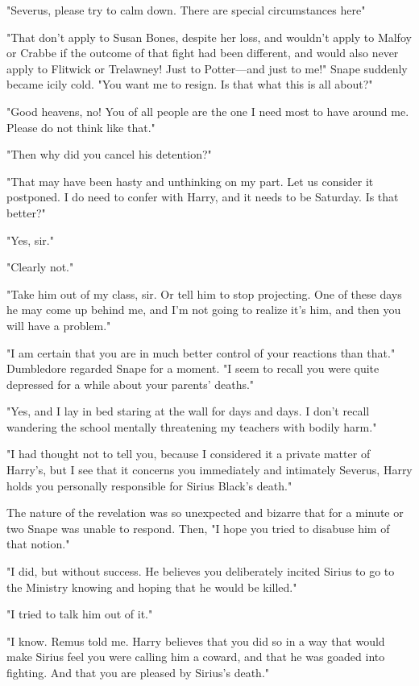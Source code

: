 "Severus, please try to calm down. There are special circumstances here{\el}"

"That don't apply to Susan Bones, despite her loss, and wouldn't apply to Malfoy or Crabbe if the outcome of that fight had been different, and would also never apply to Flitwick or Trelawney! Just to Potter—and just to me!" Snape suddenly became icily cold. "You want me to resign. Is that what this is all about?"

"Good heavens, no! You of all people are the one I need most to have around me. Please do not think like that."

"Then why did you cancel his detention?"

"That may have been hasty and unthinking on my part. Let us consider it postponed. I do need to confer with Harry, and it needs to be Saturday. Is that better?"

"Yes, sir."

"Clearly not."

"Take him out of my class, sir. Or tell him to stop projecting. One of these days he may come up behind me, and I'm not going to realize it's him, and then you will have a problem."

"I am certain that you are in much better control of your reactions than that." Dumbledore regarded Snape for a moment. "I seem to recall you were quite depressed for a while about your parents' deaths."

"Yes, and I lay in bed staring at the wall for days and days. I don't recall wandering the school mentally threatening my teachers with bodily harm."

"I had thought not to tell you, because I considered it a private matter of Harry's, but I see that it concerns you immediately and intimately{\el} Severus, Harry holds you personally responsible for Sirius Black's death."

The nature of the revelation was so unexpected and bizarre that for a minute or two Snape was unable to respond. Then, "I hope you tried to disabuse him of that notion."

"I did, but without success. He believes you deliberately incited Sirius to go to the Ministry knowing and hoping that he would be killed."

"I tried to talk him out of it."

"I know. Remus told me. Harry believes that you did so in a way that would make Sirius feel you were calling him a coward, and that he was goaded into fighting. And that you are pleased by Sirius's death."

